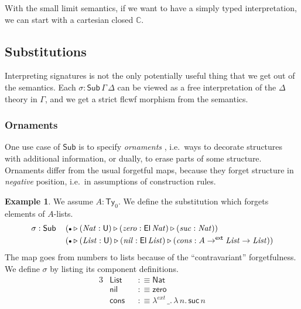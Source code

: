 \documentclass[12pt,a4paper,twoside,openany]{book}
\theoremstyle{remark}
\theoremstyle{definition}
\newtheorem{myexample}{Example}
\theoremstyle{theorem}
\newcommand{\mi}[1]{\mathit{#1}}
\newcommand{\ms}[1]{\mathsf{#1}}
\newcommand{\mbb}[1]{\mathbb{#1}}
\newcommand{\Sub}{\mathsf{Sub}}
\newcommand{\Ty}{\mathsf{Ty}}
\newcommand{\U}{\mathsf{U}}
\newcommand{\El}{\mathsf{El}}
\newcommand{\ext}{\triangleright}
\newcommand{\emptycon}{\scaleobj{.75}\bullet}
\newcommand{\toe}{\to^{\ms{ext}}}
\newcommand{\mbbC}{\mbb{C}}
\newcommand{\defn}{:\equiv}
\begin{document}
With the small limit semantics, if we want to have a simply typed
interpretation, we can start with a cartesian closed $\mbbC$.

\subsection{Substitutions}

Interpreting signatures is not the only potentially useful thing that we get out
of the semantics. Each $\sigma : \Sub\,\Gamma\,\Delta$ can be viewed as a free
interpretation of the $\Delta$ theory in $\Gamma$, and we get a strict flcwf
morphism from the semantics.

\subsubsection{Ornaments}

One use case of $\Sub$ is to specify \emph{ornaments} \cite{ornaments}, i.e.\ ways
to decorate structures with additional information, or dually, to erase parts of
some structure. Ornaments differ from the usual forgetful maps, because they
forget structure in \emph{negative} position, i.e.\ in assumptions of
construction rules.

\begin{myexample}
We assume $A : \Ty_0$. We define the substitution which forgets elements of
$A$-lists.
\begin{alignat*}{3}
  & \sigma : \Sub\,&&
  (\emptycon \ext (\mi{Nat} : \U) \ext (\mi{zero} : \El\,\mi{Nat}) \ext (\mi{suc} : \mi{Nat}))\\
  & &&(\emptycon \ext (\mi{List} : \U) \ext (\mi{nil} : \El\,\mi{List}) \ext (\mi{cons} : A \toe \mi{List} \to \mi{List}))
\end{alignat*}
The map goes from numbers to lists because of the ``contravariant''
forgetfulness. We define $\sigma$ by listing its component definitions.
\begin{alignat*}{3}
  &\ms{List} &&\defn \ms{Nat}\\
  &\ms{nil} &&\defn \ms{zero}\\
  &\ms{cons} &&\defn \lambda^{ext}\,\_.\,\lambda\,n.\,\ms{suc}\,n
\end{alignat*}
\end{myexample}
\end{document}

